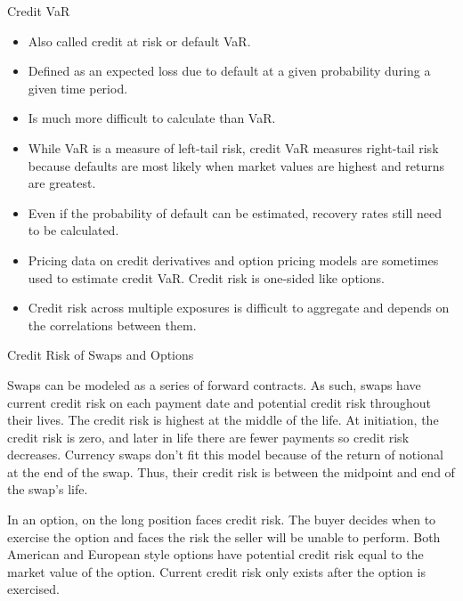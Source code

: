 \documentclass[../custom,grid]{flashcards}
\newcommand{\studyArea}{Risk Management}
\begin{document}
\begin{flashcard}[\studyArea]{Credit VaR}
    \begin{itemize}
        \item Also called credit at risk or default VaR.
        \item Defined as an expected loss due to default at a given probability during a given time period.
        \item Is much more difficult to calculate than VaR.
        \item While VaR is a measure of left-tail risk, credit VaR measures right-tail risk because defaults are most likely when market values are highest and returns are greatest.
        \item Even if the probability of default can be estimated, recovery rates still need to be calculated.
        \item Pricing data on credit derivatives and option pricing models are sometimes used to estimate credit VaR. Credit risk is one-sided like options.
        \item Credit risk across multiple exposures is difficult to aggregate and depends on the correlations between them.
    \end{itemize}
\end{flashcard}

\begin{flashcard}[\studyArea]{Credit Risk of Swaps and Options}
    \begin{flushleft}
        Swaps can be modeled as a series of forward contracts. As such, swaps have current credit risk on each payment date and potential credit risk throughout their lives. The credit risk is highest at the middle of the life. At initiation, the credit risk is zero, and later in life there are fewer payments so credit risk decreases. Currency swaps don't fit this model because of the return of notional at the end of the swap. Thus, their credit risk is between the midpoint and end of the swap's life.\newline

        In an option, on the long position faces credit risk. The buyer decides when to exercise the option and faces the risk the seller will be unable to perform. Both American and European style options have potential credit risk equal to the market value of the option. Current credit risk only exists after the option is exercised.
    \end{flushleft}
\end{flashcard}
\end{document}
